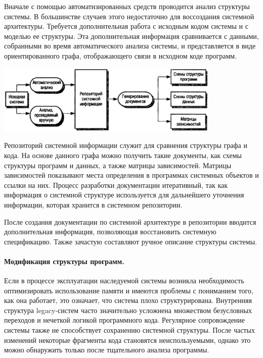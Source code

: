 \documentclass{../../text-style}
\begin{document}
Вначале с помощью автоматизированных средств проводится анализ структуры системы. В большинстве случаев этого недостаточно для воссоздания системной архитектуры. Требуется дополнительная работа с исходным кодом системы и с моделью ее структуры. Эта дополнительная информация сравнивается с данными, собранными во время автоматического анализа системы, и представляется в виде ориентированного графа, отображающего связи в исходном коде программ.

\begin{center}
    \includegraphics[width=0.8\textwidth]{programStructureAnalysis.png}
\end{center}

Репозиторий системной информации служит для сравнения структуры графа и кода. На основе данного графа можно получить такие документы, как схемы структуры программ и данных, а также матрицы зависимостей. Матрицы зависимостей показывают места определения в программах системных объектов и ссылки на них. Процесс разработки документации итеративный, так как информация о системной структуре используется для дальнейшего уточнения информации, которая хранится в системном репозитории.

После создания документации по системной архитектуре в репозитории вводится дополнительная информация, позволяющая восстановить системную спецификацию. Также зачастую составляют ручное описание структуры системы. 

\paragraph{Модификация структуры программ.} Если в процессе эксплуатации наследуемой системы возникла необходимость оптимизировать использование памяти и имеются проблемы с пониманием того, как она работает, это означает, что система плохо структурирована. Внутренняя структура legacy-систем часто значительно усложнена множеством безусловных переходов и нечеткой логикой программного кода. Регулярное сопровождение системы также не способствует сохранению системной структуры. После частых изменений некоторые фрагменты кода становятся неиспользуемыми, однако это можно обнаружить только после тщательного анализа программы.
\end{document}

